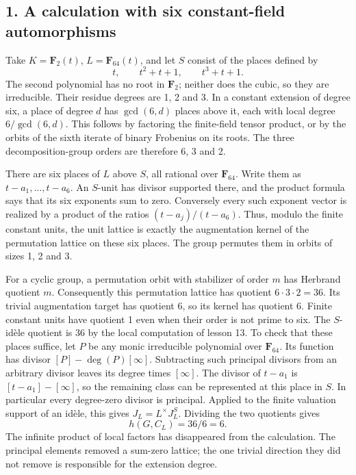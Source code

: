 \documentclass[11pt,a4paper]{article}
\begin{document}
\subsection{1. A calculation with six constant-field
automorphisms}\label{a-calculation-with-six-constant-field-automorphisms}

Take \(K=\mathbf F_2(t)\), \(L=\mathbf F_{64}(t)\), and let \(S\)
consist of the places defined by \[
t,\qquad t^2+t+1,\qquad t^3+t+1.
\] The second polynomial has no root in \(\mathbf F_2\); neither does
the cubic, so they are irreducible. Their residue degrees are 1, 2 and
3. In a constant extension of degree six, a place of degree \(d\) has
\(\gcd(6,d)\) places above it, each with local degree \(6/\gcd(6,d)\).
This follows by factoring the finite-field tensor product, or by the
orbits of the sixth iterate of binary Frobenius on its roots. The three
decomposition-group orders are therefore 6, 3 and 2.

There are six places of \(L\) above \(S\), all rational over
\(\mathbf F_{64}\). Write them as \(t-a_1,\ldots,t-a_6\). An \(S\)-unit
has divisor supported there, and the product formula says that its six
exponents sum to zero. Conversely every such exponent vector is realized
by a product of the ratios \((t-a_j)/(t-a_6)\). Thus, modulo the finite
constant units, the unit lattice is exactly the augmentation kernel of
the permutation lattice on these six places. The group permutes them in
orbits of sizes 1, 2 and 3.

For a cyclic group, a permutation orbit with stabilizer of order \(m\)
has Herbrand quotient \(m\). Consequently this permutation lattice has
quotient \(6\cdot3\cdot2=36\). Its trivial augmentation target has
quotient 6, so its kernel has quotient 6. Finite constant units have
quotient 1 even when their order is not prime to six. The \(S\)-idèle
quotient is 36 by the local computation of lesson 13. To check that
these places suffice, let \(P\) be any monic irreducible polynomial over
\(\mathbf F_{64}\). Its function has divisor \([P]-\deg(P)[\infty]\).
Subtracting such principal divisors from an arbitrary divisor leaves its
degree times \([\infty]\). The divisor of \(t-a_1\) is
\([t-a_1]-[\infty]\), so the remaining class can be represented at this
place in \(S\). In particular every degree-zero divisor is principal.
Applied to the finite valuation support of an idèle, this gives
\(J_L=L^\times J_L^S\). Dividing the two quotients gives \[
h(G,C_L)=36/6=6.
\] The infinite product of local factors has disappeared from the
calculation. The principal elements removed a sum-zero lattice; the one
trivial direction they did not remove is responsible for the extension
degree.
\end{document}
